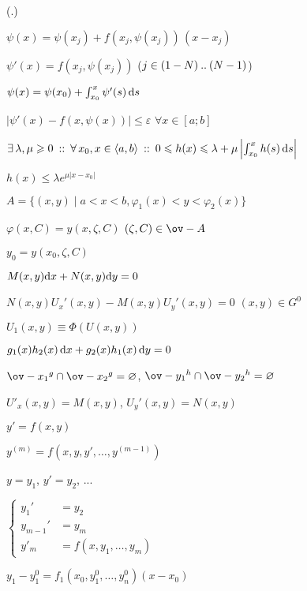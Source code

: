 \documentclass[hardcopy]{longnotes}
\begin{document}
\begin{list}
{(\thechn.\theeqn)}
{
  \setlength{\labelwidth}{2cm}
  \setlength{\labelsep}{1em}
  \renewcommand{\makelabel}[1]{#1 \usebox{\smtri}}
}

\skeq[4]
  \item $\psi (x) = \psi(x_j) + f(x_j, \psi(x_j))\, (x-x_j)$
  \item $\psi'(x) = f(x_j, \psi(x_j))$ 
    \hfill ($j\in (1-N) \mathbin{..} (N-1)$)
  \item $\psi (x) = \psi(x_0) + \int_{x_0}^x \psi'(s) \, \mathrm{d} s$
  \item $|\psi'(x) - f(x,\psi(x))| \leqslant \varepsilon$
    \hfill $\forall x\in [a;b]$
\skeq
  \item $\exists\, \lambda, \mu \geqslant 0 \:::\: 
    \forall\, x_0 , x\in \langle a,b \rangle \:::\: 
    0 \leqslant h(x) \leqslant\lambda+
    \mu \left|\int_{x_0}^x h(s) \,\mathrm{d} s \right|$
  \item $h(x) \leqslant \lambda e^{\mu |x-x_0|}$
\skeq
  \item $A = \{(x,y) \mid a<x<b, \varphi_1(x) <y<\varphi_2(x)\}$
  \item $\varphi(x,C) = y(x,\zeta, C)$
    \hfill $(\zeta,C) \in \ov-{A}$
  \item $y_0 = y(x_0, \zeta, C)$
\nch
  \item $M(x,y)\mathrm{d} x + N(x,y)\mathrm{d} y =0$
    \skeq[7]
  \item $N(x,y)U_x'(x,y) - M(x,y)U_y'(x,y)=0$ \hfill $(x,y) \in G^0$
  \item $U_1(x,y) \equiv \Phi(U(x,y))$
  \item $g_1(x)h_2(x) \, \mathrm{d} x+ g_2(x) h_1(x) \, \mathrm{d} y =0 $
  \item $\ov-{x_1}^g \cap \ov-{x_2}^g = \varnothing$, $\ov-{y_1}^h \cap \ov-{y_2}^h = \varnothing$
\skeq[4]
  \item $U'_x(x,y) = M(x,y)$, $U_y'(x,y) = N(x,y)$
\nch
  \item $y'=f(x,y)$
  \item $y^{(m)} = f(x,y,y', \dotsc, y^{(m-1)})$
  \item $y=y_1$, $y'=y_2$, ...
  \item 
    $ \left\{
    \begin{aligned}
      y_1' &= y_2 \\
      y_{m-1}' &= y_m \\
      y'_m &= f(x,y_1, \dotsc, y_m)
    \end{aligned} \right.
    $
  \item $y_1  - y_1^0 = f_1(x_0,y_1^0, \dotsc, y_n^0)(x-x_0)$

\end{list}
\end{document}
